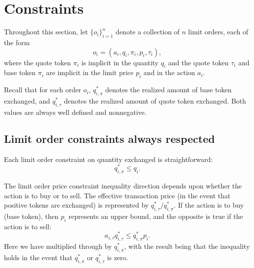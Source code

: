 \documentclass[11pt, reqno]{amsart}
\theoremstyle{definition}
\theoremstyle{remark}
\begin{document}
%
%

\section{Constraints}

Throughout this section, let $\{o_i\}_{i=1}^n$ denote a collection of $n$ limit
orders, each of the form
\[
	o_i = (a_i, q_i, \pi_i, p_i, \tau_i),
\]
where the quote token $\pi_i$ is implicit in the quantity $q_i$ and
the quote token $\tau_i$ and base token $\pi_i$ are implicit in the limit price
$p_i$ and in the action $a_i$.

Recall that for each order $o_i$, $q_{i, \pi}^*$ denotes the realized amount of
base token exchanged, and $q_{i, \tau}^*$ denotes the realized amount of quote
token exchanged. Both values are always well defined and nonnegative.

\subsection{Limit order constraints always respected}

Each limit order constraint on quantity exchanged is straightforward:
\begin{equation}\label{limit_order_quantity_constraint}
    q_{i, \pi}^* \leq q_i.
\end{equation}

The limit order price constraint inequality direction depends upon whether the
action is to buy or to sell.
The effective transaction price (in the event that positive tokens are
exchanged) is represented by $q_{i, \tau}^* / q_{i, \pi}^*$. If the action is to
buy (base token), then $p_i$ represents an upper bound, and the opposite is true
if the action is to sell:
\begin{equation}\label{limit_order_price_constraint}
    a_{i, \tau} q_{i, \tau}^* \leq q_{i, \pi}^* p_i.
\end{equation}
Here we have multiplied through by $q_{i, \pi}^*$, with the result being that
the inequality holds in the event that $q_{i, \pi}^*$ or $q_{i, \tau}^*$ is
zero.
\end{document}
